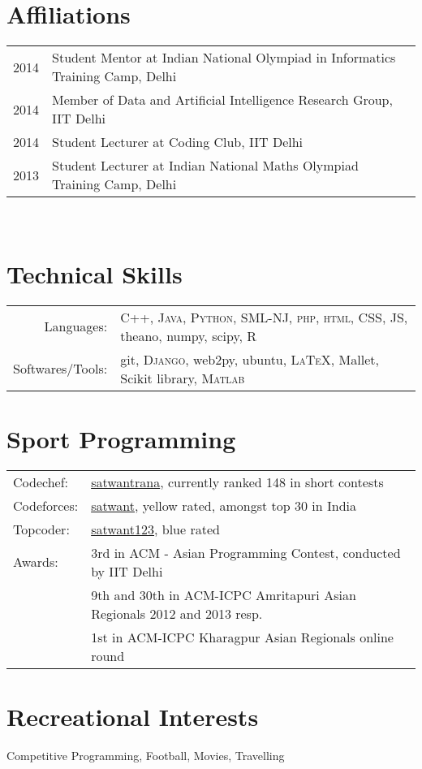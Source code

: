 \documentclass[margin,line]{res}
\begin{document}
\begin{resume}
\section{\sc Affiliations} 
\begin{tabular}{rl}
2014 & Student Mentor at Indian National Olympiad in Informatics Training Camp, Delhi\\
2014 & Member of Data and Artificial Intelligence Research Group, IIT Delhi \\
2014 & Student Lecturer at Coding Club, IIT Delhi\\
2013 & Student Lecturer at Indian National Maths Olympiad Training Camp, Delhi\\
\end{tabular}\\

\section{\sc Technical Skills}

\begin{tabular}{rl}
Languages: & \textsc{C++}, \textsc{Java}, \textsc{Python}, \textsc{SML-NJ}, \textsc{php}, \textsc{html}, \textsc{CSS}, \textsc{JS}, theano, numpy, scipy, R\\

Softwares/Tools: & git, \textsc{Django}, web2py, ubuntu, \textsc{LaTeX}, Mallet, Scikit library,  \textsc{Matlab}\\

\end{tabular}

\section{\sc Sport Programming}

\begin{tabular}{ll}
Codechef: & \href{http://www.codechef.com/users/satwantrana}{satwantrana}, currently ranked 148 in short contests\\
Codeforces: & \href{http://codeforces.com/profile/satwant}{satwant}, yellow rated, amongst top 30 in India\\
Topcoder: & \href{http://community.topcoder.com/tc?module=MemberProfile&cr=23152984}{satwant123}, blue rated\\
Awards: & 3rd in ACM - Asian Programming Contest, conducted by IIT Delhi\\
& 9th and 30th in ACM-ICPC Amritapuri Asian Regionals 2012 and 2013 resp.\\
& 1st in ACM-ICPC Kharagpur Asian Regionals online round

\end{tabular}

\section{\sc Recreational Interests}
Competitive Programming, Football, Movies, Travelling

\end{resume}
\end{document}
